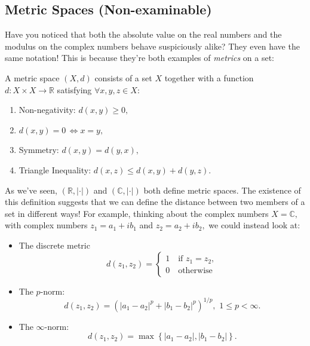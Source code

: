 \documentclass[
  17pt,
  a4paper]{extarticle}
\providecommand{\tightlist}{%
  \setlength{\itemsep}{0pt}\setlength{\parskip}{0pt}}
\theoremstyle{plain}
\theoremstyle{definition}
\theoremstyle{plain}
\theoremstyle{plain}
\theoremstyle{plain}
\theoremstyle{plain}
\theoremstyle{definition}
\theoremstyle{definition}
\theoremstyle{remark}
\theoremstyle{remark}
\let\BeginKnitrBlock\begin \let\EndKnitrBlock\end
\renewcommand{\;}{\,}
\begin{document}
\hypertarget{metric-spaces-non-examinable}{%
\subsection{Metric Spaces (Non-examinable)}\label{metric-spaces-non-examinable}}

Have you noticed that both the absolute value on the real numbers and the modulus on the complex numbers behave suspiciously alike? They even have the same notation! This is because they're both examples of \emph{metrics} on a set:

\BeginKnitrBlock{definition}[Metric Space]
{\label{def:def3} }A metric space \((X,d)\) consists of a set \(X\) together with a function \(d: X\times X \to \mathbb{R}\) satisfying \(\forall x,y,z \in X:\)

\begin{enumerate}
\def\labelenumi{\roman{enumi})}
\tightlist
\item
  Non-negativity: \(d(x,y) \geq 0,\)
\item
  \(d(x,y) = 0 \; \Leftrightarrow x = y,\)
\item
  Symmetry: \(d(x,y) = d(y,x),\)
\item
  Triangle Inequality: \(d(x,z) \leq d(x,y) + d(y,z).\)
\end{enumerate}
\EndKnitrBlock{definition}

As we've seen, \((\mathbb{R}, \lvert \cdot \rvert)\) and \((\mathbb{C}, \lvert \cdot \rvert)\) both define metric spaces. The existence of this definition suggests that we can define the distance between two members of a set in different ways! For example, thinking about the complex numbers \(X = \mathbb{C},\) with complex numbers \(z_1 = a_1 + ib_1\) and \(z_2 = a_2 + ib_2,\) we could instead look at:

\begin{itemize}
\tightlist
\item
  The discrete metric \[d(z_1,z_2) = \begin{cases} 1 \quad \text{if $z_1=z_2$},\\
  0 \quad \text{otherwise}\end{cases}\]
\item
  The \(p\)-norm: \[d(z_1,z_2) = \left(\lvert a_1-a_2\rvert^p + \lvert b_1-b_2\rvert ^p\right)^{1/p},\;\; 1\leq p < \infty.\]
\item
  The \(\infty\)-norm: \[d(z_1,z_2) = \max\left\lbrace \lvert a_1 - a_2 \rvert, \lvert b_1 - b_2 \rvert\right\rbrace.\]
\end{itemize}
\end{document}
